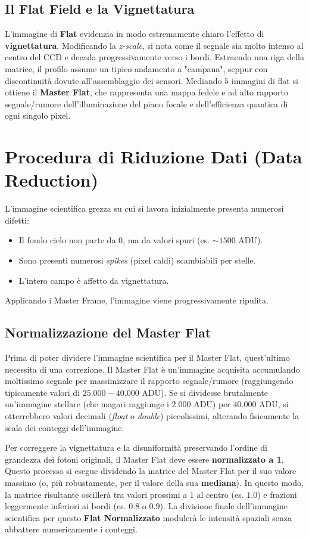 \subsection{Il Flat Field e la Vignettatura}
L'immagine di \textbf{Flat} evidenzia in modo estremamente chiaro l'effetto di \textbf{vignettatura}. Modificando la \textit{z-scale}, si nota come il segnale sia molto intenso al centro del CCD e decada progressivamente verso i bordi. Estraendo una riga della matrice, il profilo assume un tipico andamento a "campana", seppur con discontinuità dovute all'assemblaggio dei sensori.
Mediando $5$ immagini di flat si ottiene il \textbf{Master Flat}, che rappresenta una mappa fedele e ad alto rapporto segnale/rumore dell'illuminazione del piano focale e dell'efficienza quantica di ogni singolo pixel.

\section{Procedura di Riduzione Dati (Data Reduction)}

L'immagine scientifica grezza su cui si lavora inizialmente presenta numerosi difetti:
\begin{itemize}
\item Il fondo cielo non parte da $0$, ma da valori spuri (es. $\sim 1500 \text{ ADU}$).
\item Sono presenti numerosi \textit{spikes} (pixel caldi) scambiabili per stelle.
\item L'intero campo è affetto da vignettatura.
\end{itemize}
Applicando i Master Frame, l'immagine viene progressivamente ripulita.

\subsection{Normalizzazione del Master Flat}
Prima di poter dividere l'immagine scientifica per il Master Flat, quest'ultimo necessita di una correzione. Il Master Flat è un'immagine acquisita accumulando moltissimo segnale per massimizzare il rapporto segnale/rumore (raggiungendo tipicamente valori di $25.000 - 40.000 \text{ ADU}$).
Se si dividesse brutalmente un'immagine stellare (che magari raggiunge i $2.000 \text{ ADU}$) per $40.000 \text{ ADU}$, si otterrebbero valori decimali (\textit{float} o \textit{double}) piccolissimi, alterando fisicamente la scala dei conteggi dell'immagine.

Per correggere la vignettatura e la disuniformità preservando l'ordine di grandezza dei fotoni originali, il Master Flat deve essere \textbf{normalizzato a 1}.
Questo processo si esegue dividendo la matrice del Master Flat per il suo valore massimo (o, più robustamente, per il valore della sua \textbf{mediana}). In questo modo, la matrice risultante oscillerà tra valori prossimi a $1$ al centro (es. $1.0$) e frazioni leggermente inferiori ai bordi (es. $0.8$ o $0.9$). La divisione finale dell'immagine scientifica per questo \textbf{Flat Normalizzato} modulerà le intensità spaziali senza abbattere numericamente i conteggi.

